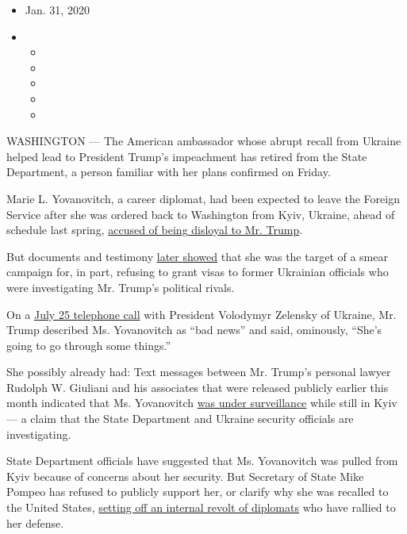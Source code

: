 \begin{itemize}
\item
  Jan. 31, 2020
\item
  \begin{itemize}
  \item
  \item
  \item
  \item
  \item
  \end{itemize}
\end{itemize}

WASHINGTON --- The American ambassador whose abrupt recall from Ukraine
helped lead to President Trump's impeachment has retired from the State
Department, a person familiar with her plans confirmed on Friday.

Marie L. Yovanovitch, a career diplomat, had been expected to leave the
Foreign Service after she was ordered back to Washington from Kyiv,
Ukraine, ahead of schedule last spring,
\href{https://www.nytimes.com/2019/10/11/us/politics/marie-yovanovitch-trump-impeachment.html}{accused
of being disloyal to Mr. Trump}.

But documents and testimony
\href{https://www.nytimes.com/2019/11/15/us/politics/marie-yovanovitch-facts-bio.html}{later
showed} that she was the target of a smear campaign for, in part,
refusing to grant visas to former Ukrainian officials who were
investigating Mr. Trump's political rivals.

On a
\href{https://www.nytimes.com/interactive/2019/09/25/us/politics/trump-ukraine-transcript.html?module=inline}{July
25 telephone call} with President Volodymyr Zelensky of Ukraine, Mr.
Trump described Ms. Yovanovitch as ``bad news'' and said, ominously,
``She's going to go through some things.''

She possibly already had: Text messages between Mr. Trump's personal
lawyer Rudolph W. Giuliani and his associates that were released
publicly earlier this month indicated that Ms. Yovanovitch
\href{https://www.nytimes.com/2020/01/16/world/europe/ukraine-yovanovitch-investigation.html}{was
under surveillance} while still in Kyiv --- a claim that the State
Department and Ukraine security officials are investigating.

State Department officials have suggested that Ms. Yovanovitch was
pulled from Kyiv because of concerns about her security. But Secretary
of State Mike Pompeo has refused to publicly support her, or clarify why
she was recalled to the United States,
\href{https://www.nytimes.com/2019/11/04/us/politics/mike-pompeo-ukraine-state-department.html}{setting
off an internal revolt of diplomats} who have rallied to her defense.

